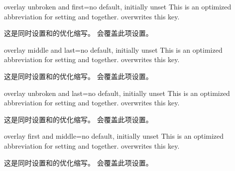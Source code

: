 
\begin{docTcbKey}{overlay unbroken and first}{=}{no default, initially unset}
 This is an optimized abbreviation for setting
  and
  together.
  overwrites this key.

这是同时设置和的优化缩写。
会覆盖此项设置。
\end{docTcbKey}

\begin{docTcbKey}{overlay middle and last}{=}{no default, initially unset}
 This is an optimized abbreviation for setting
  and
  together.
  overwrites this key.

这是同时设置和的优化缩写。
会覆盖此项设置。
\end{docTcbKey}

\begin{docTcbKey}{overlay unbroken and last}{=}{no default, initially unset}
 This is an optimized abbreviation for setting
  and
  together.
  overwrites this key.

这是同时设置和的优化缩写。
会覆盖此项设置。
\end{docTcbKey}





\begin{docTcbKey}[][doc new=2014-09-19]{overlay first and middle}{=}{no default, initially unset}
 This is an optimized abbreviation for setting
  and  together.
  overwrites this key.

这是同时设置和的优化缩写。
会覆盖此项设置。
\end{docTcbKey}

